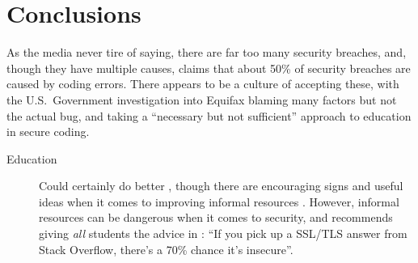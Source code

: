 \documentclass{llncs}
\begin{document}
\section{Conclusions}
As the media never tire of saying, there are far too many security breaches, and, though they have multiple causes, \cite{McGraw2006} claims that about 50\% of security breaches are caused by coding errors. There appears to be a culture of accepting these, with the U.S.~Government investigation \cite{GAO2018a} into Equifax blaming many factors but not the actual bug, and \cite{PCI2018b}  taking a ``necessary but not sufficient'' approach to education in secure coding.
\begin{description}
\item[Education]Could certainly do better \cite{Cable2019a}, though there are encouraging signs \cite{Cricketal2019a} and useful ideas when it comes to improving informal resources  \cite{Fischeretal2019a}. However, informal resources can be dangerous when it comes to security, and \cite{Cricketal2019a} recommends giving \emph{all} students the advice in \cite{Chenetal2019a}: ``If you pick up a SSL/TLS answer from Stack Overflow, there's a 70\% chance it's insecure''.


\end{description}
\end{document}
